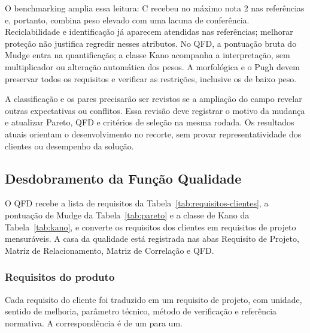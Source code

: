 O benchmarking amplia essa leitura: C recebeu no máximo nota 2 nas referências e, portanto, combina peso elevado com uma lacuna de conferência. Reciclabilidade e identificação já aparecem atendidas nas referências; melhorar proteção não justifica regredir nesses atributos. No QFD, a pontuação bruta do Mudge entra na quantificação; a classe Kano acompanha a interpretação, sem multiplicador ou alteração automática dos pesos. A morfológica e o Pugh devem preservar todos os requisitos e verificar as restrições, inclusive os de baixo peso.

A classificação e os pares precisarão ser revistos se a ampliação do campo revelar outras expectativas ou conflitos. Essa revisão deve registrar o motivo da mudança e atualizar Pareto, QFD e critérios de seleção na mesma rodada. Os resultados atuais orientam o desenvolvimento no recorte, sem provar representatividade dos clientes ou desempenho da solução.


\subsection{Desdobramento da Função Qualidade}

O QFD recebe a lista de requisitos da Tabela~\ref{tab:requisitos-clientes}, a pontuação de Mudge da Tabela~\ref{tab:pareto} e a classe de Kano da Tabela~\ref{tab:kano}, e converte os requisitos dos clientes em requisitos de projeto mensuráveis. A casa da qualidade está registrada nas abas Requisito de Projeto, Matriz de Relacionamento, Matriz de Correlação e QFD.

\subsubsection{Requisitos do produto}

Cada requisito do cliente foi traduzido em um requisito de projeto, com unidade, sentido de melhoria, parâmetro técnico, método de verificação e referência normativa. A correspondência é de um para um.


